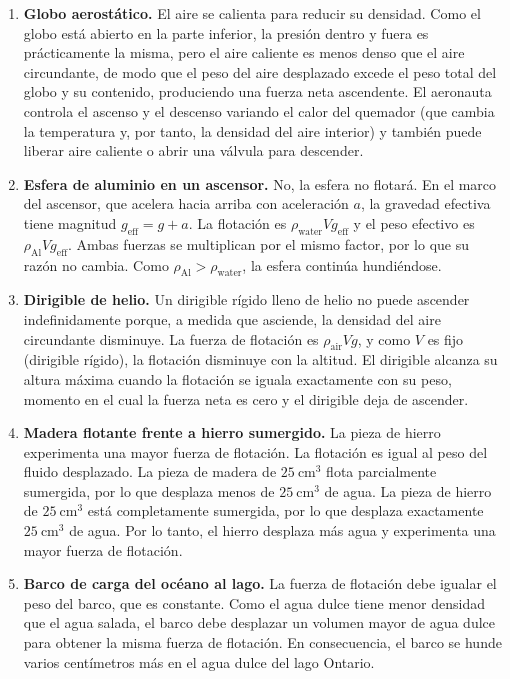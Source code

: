 \begin{enumerate}
\item \textbf{Globo aerostático.} El aire se calienta para reducir su densidad. Como el globo está abierto en la parte inferior, la presión dentro y fuera es prácticamente la misma, pero el aire caliente es menos denso que el aire circundante, de modo que el peso del aire desplazado excede el peso total del globo y su contenido, produciendo una fuerza neta ascendente. El aeronauta controla el ascenso y el descenso variando el calor del quemador (que cambia la temperatura y, por tanto, la densidad del aire interior) y también puede liberar aire caliente o abrir una válvula para descender.

\item \textbf{Esfera de aluminio en un ascensor.} No, la esfera no flotará. En el marco del ascensor, que acelera hacia arriba con aceleración $a$, la gravedad efectiva tiene magnitud $g_{\mathrm{eff}}=g+a$. La flotación es $\rho_{\mathrm{water}}Vg_{\mathrm{eff}}$ y el peso efectivo es $\rho_{\mathrm{Al}}Vg_{\mathrm{eff}}$. Ambas fuerzas se multiplican por el mismo factor, por lo que su razón no cambia. Como $\rho_{\mathrm{Al}}>\rho_{\mathrm{water}}$, la esfera continúa hundiéndose.

\item \textbf{Dirigible de helio.} Un dirigible rígido lleno de helio no puede ascender indefinidamente porque, a medida que asciende, la densidad del aire circundante disminuye. La fuerza de flotación es $\rho_{\mathrm{air}} V g$, y como $V$ es fijo (dirigible rígido), la flotación disminuye con la altitud. El dirigible alcanza su altura máxima cuando la flotación se iguala exactamente con su peso, momento en el cual la fuerza neta es cero y el dirigible deja de ascender.

\item \textbf{Madera flotante frente a hierro sumergido.} La pieza de hierro experimenta una mayor fuerza de flotación. La flotación es igual al peso del fluido desplazado. La pieza de madera de $25\ \mathrm{cm^3}$ flota parcialmente sumergida, por lo que desplaza menos de $25\ \mathrm{cm^3}$ de agua. La pieza de hierro de $25\ \mathrm{cm^3}$ está completamente sumergida, por lo que desplaza exactamente $25\ \mathrm{cm^3}$ de agua. Por lo tanto, el hierro desplaza más agua y experimenta una mayor fuerza de flotación.

\item \textbf{Barco de carga del océano al lago.} La fuerza de flotación debe igualar el peso del barco, que es constante. Como el agua dulce tiene menor densidad que el agua salada, el barco debe desplazar un volumen mayor de agua dulce para obtener la misma fuerza de flotación. En consecuencia, el barco se hunde varios centímetros más en el agua dulce del lago Ontario.


\end{enumerate}
